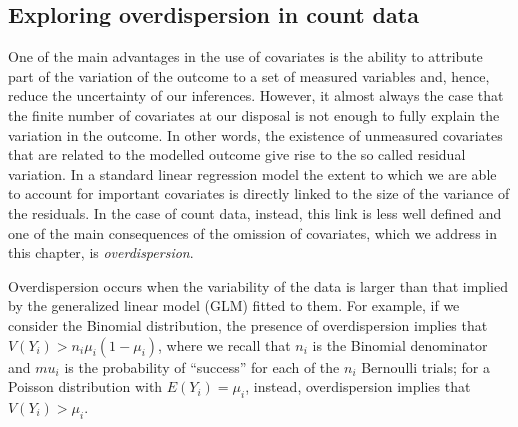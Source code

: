 \documentclass[
  letterpaper,
]{krantz}
\begin{document}
\hypertarget{sec-overdispersion}{%
\subsection{Exploring overdispersion in count
data}\label{sec-overdispersion}}

One of the main advantages in the use of covariates is the ability to
attribute part of the variation of the outcome to a set of measured
variables and, hence, reduce the uncertainty of our inferences. However,
it almost always the case that the finite number of covariates at our
disposal is not enough to fully explain the variation in the outcome. In
other words, the existence of unmeasured covariates that are related to
the modelled outcome give rise to the so called residual variation. In a
standard linear regression model the extent to which we are able to
account for important covariates is directly linked to the size of the
variance of the residuals. In the case of count data, instead, this link
is less well defined and one of the main consequences of the omission of
covariates, which we address in this chapter, is \emph{overdispersion}.

Overdispersion occurs when the variability of the data is larger than
that implied by the generalized linear model (GLM) fitted to them. For
example, if we consider the Binomial distribution, the presence of
overdispersion implies that \(V(Y_i) > n_i \mu_{i}(1-\mu_i)\), where we
recall that \(n_i\) is the Binomial denominator and \(mu_i\) is the
probability of ``success'' for each of the \(n_i\) Bernoulli trials; for
a Poisson distribution with \(E(Y_i) = \mu_i\), instead, overdispersion
implies that \(V(Y_i) > \mu_{i}\).
\end{document}
